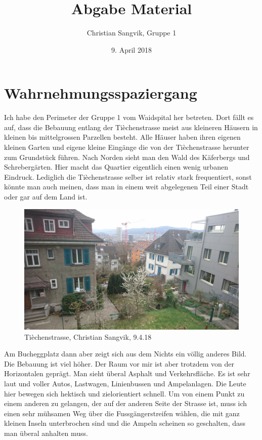 \documentclass[a4paper,ngerman,11pt]{scrartcl}
\author{Christian Sangvik, Gruppe 1}
\date{9. April 2018}
\title{Abgabe Material}
\begin{document}
\maketitle


\section*{Wahrnehmungsspaziergang}
\label{sec-1}

Ich habe den Perimeter der Gruppe 1 vom Waidspital her betreten. Dort fällt es
auf, dass die Bebauung entlang der Tièchenstrasse meist aus kleineren Häusern
in kleinen bis mittelgrossen Parzellen besteht. Alle Häuser haben ihren
eigenen kleinen Garten und eigene kleine Eingänge die von der Tièchenstrasse
herunter zum Grundstück führen. Nach Norden sieht man den Wald
des Käferbergs und Schrebergärten. Hier macht das Quartier eigentlich einen
wenig urbanen Eindruck. Lediglich die Tièchenstrasse selber ist relativ stark
frequentiert, sonst könnte man auch meinen, dass man in einem weit abgelegenen
Teil einer Stadt oder gar auf dem Land ist.

\begin{figure}[H]
\centering
\includegraphics[width=\textwidth]{Fotos/DSC_0522.JPG}
\caption{Tièchenstrasse, Christian Sangvik, 9.4.18}
\end{figure}

Am Bucheggplatz dann aber zeigt sich aus dem Nichts ein völlig anderes
Bild. Die Bebauung ist viel höher. Der Raum vor mir ist aber trotzdem von der
Horizontalen geprägt. Man sieht überal Asphalt und Verkehrsfläche. Es ist sehr laut
und voller Autos, Lastwagen, Linienbussen und Ampelanlagen. Die Leute hier
bewegen sich hektisch und zielorientiert schnell. Um von einem Punkt zu einem
anderen zu gelangen, der auf der anderen Seite der Strasse ist, muss ich einen
sehr mühsamen Weg über die Fussgängerstreifen wählen, die mit ganz kleinen
Inseln unterbrochen sind und die Ampeln scheinen so geschalten, dass man
überal anhalten muss.
\end{document}
